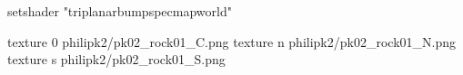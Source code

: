 setshader "triplanarbumpspecmapworld"

texture 0 philipk2/pk02_rock01_C.png
texture n philipk2/pk02_rock01_N.png
texture s philipk2/pk02_rock01_S.png

